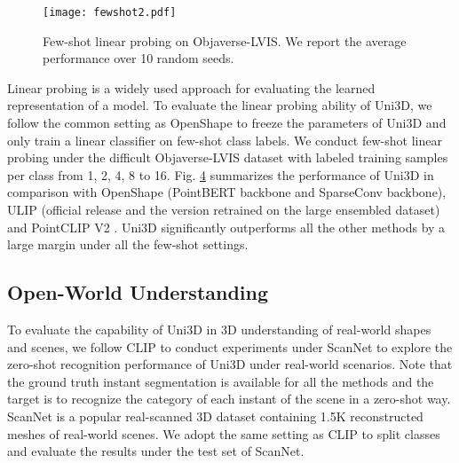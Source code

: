 \documentclass{article} \usepackage{iclr2024_conference,times}
\def\Ours{Uni3D\xspace}
\begin{document}
\begin{wrapfigure}{r}{0.4\linewidth}
\label{fig:fewshot}
  \vspace{-0.7cm}

  \texttt{[image: fewshot2.pdf]}
  \vspace{-0.9cm}
  
  \caption{Few-shot linear probing on Objaverse-LVIS. We report the average performance over 10 random seeds.}
  \vspace{-0.5cm}
\end{wrapfigure}

Linear probing is a widely used approach for evaluating the learned representation of a model. To evaluate the linear probing ability of \Ours, we follow the common setting as OpenShape \citep{liu2023openshape} to freeze the parameters of \Ours and only train a linear classifier on few-shot class labels. We conduct few-shot linear probing under the difficult Objaverse-LVIS dataset with labeled training samples per class from 1, 2, 4, 8 to 16. Fig. \hyperref[fig:fewshot]{4} summarizes the performance of \Ours in comparison with OpenShape \citep{liu2023openshape} (PointBERT backbone and SparseConv backbone), ULIP \citep{xue2023ulip} (official release and the version retrained on the large ensembled dataset) and PointCLIP V2 \citep{zhu2022pointclipv2}. \Ours significantly outperforms all the other methods by a large margin under all the few-shot settings.

\subsection{Open-World Understanding}

To evaluate the capability of \Ours in 3D understanding of real-world shapes and scenes, we follow CLIP \citep{zeng2023clip2} to conduct experiments under ScanNet \citep{dai2017scannet} to explore the zero-shot recognition performance of \Ours under real-world scenarios. Note that the ground truth instant segmentation is available for all the methods and the target is to recognize the category of each instant of the scene in a zero-shot way. ScanNet \citep{dai2017scannet} is a popular real-scanned 3D dataset containing 1.5K reconstructed meshes of real-world scenes. We adopt the same setting as CLIP to split classes and evaluate the results under the test set of ScanNet. 
\end{document}
